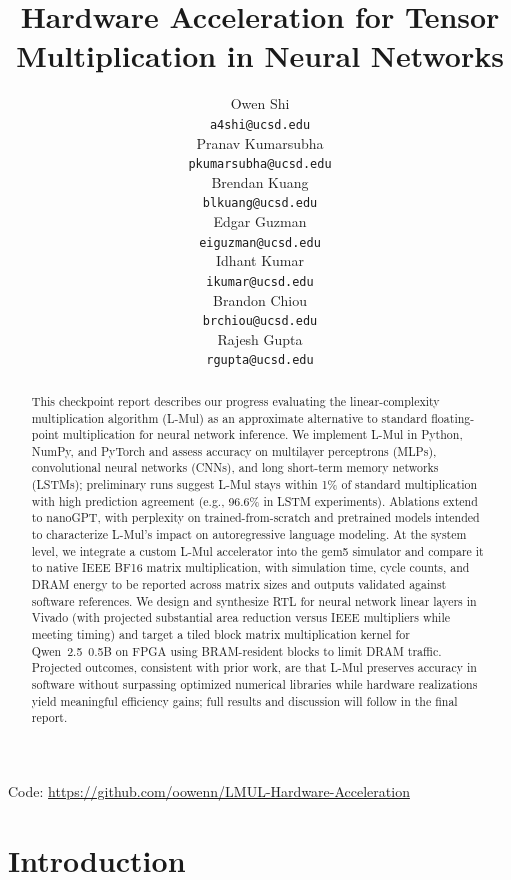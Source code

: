\documentclass[12pt,letterpaper]{article}
\title{Hardware Acceleration for Tensor Multiplication in Neural Networks}
\author{Owen Shi \\
  {\tt a4shi@ucsd.edu} \\\And
  Pranav Kumarsubha \\
  {\tt pkumarsubha@ucsd.edu} \\\And
  Brendan Kuang \\
  {\tt blkuang@ucsd.edu} \\\And
  Edgar Guzman \\
  {\tt eiguzman@ucsd.edu} \\\And
  Idhant Kumar \\
  {\tt ikumar@ucsd.edu} \\\And
  Brandon Chiou \\
  {\tt 	brchiou@ucsd.edu} \\\And
  Rajesh Gupta \\
  {\tt rgupta@ucsd.edu} \\}
\begin{document}
\maketitle


\begin{abstract}
This checkpoint report describes our progress evaluating the linear-complexity multiplication algorithm (L-Mul) as an approximate alternative to standard floating-point multiplication for neural network inference. We implement L-Mul in Python, NumPy, and PyTorch and assess accuracy on multilayer perceptrons (MLPs), convolutional neural networks (CNNs), and long short-term memory networks (LSTMs); preliminary runs suggest L-Mul stays within 1\% of standard multiplication with high prediction agreement (e.g., 96.6\% in LSTM experiments). Ablations extend to nanoGPT, with perplexity on trained-from-scratch and pretrained models intended to characterize L-Mul's impact on autoregressive language modeling. At the system level, we integrate a custom L-Mul accelerator into the gem5 simulator and compare it to native IEEE BF16 matrix multiplication, with simulation time, cycle counts, and DRAM energy to be reported across matrix sizes and outputs validated against software references. We design and synthesize RTL for neural network linear layers in Vivado (with projected substantial area reduction versus IEEE multipliers while meeting timing) and target a tiled block matrix multiplication kernel for Qwen~2.5~0.5B on FPGA using BRAM-resident blocks to limit DRAM traffic. Projected outcomes, consistent with prior work, are that L-Mul preserves accuracy in software without surpassing optimized numerical libraries while hardware realizations yield meaningful efficiency gains; full results and discussion will follow in the final report.
\end{abstract}

\begin{center}
Code: \url{https://github.com/oowenn/LMUL-Hardware-Acceleration}
\end{center}

\maketoc
\clearpage


\section{Introduction}
\end{document}
